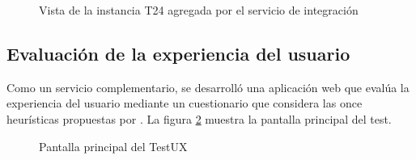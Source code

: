 \begin{figure}[!ht]
	\centering
    \caption{Vista de la instancia T24 agregada por el servicio de integraci\'on}
    \label{instanciaProtege}
\end{figure}

\subsection{Evaluaci\'on de la experiencia del usuario}

Como un servicio complementario, se desarroll\'o una aplicaci\'on web que eval\'ua la experiencia del usuario mediante un cuestionario que considera las once heur\'isticas propuestas por \cite{OnceHeuristicas}. La figura \ref{testUX} muestra la pantalla principal del test.\newline

\begin{figure}[!ht]
	\centering
    \caption{Pantalla principal del TestUX}
    \label{testUX}
\end{figure}

